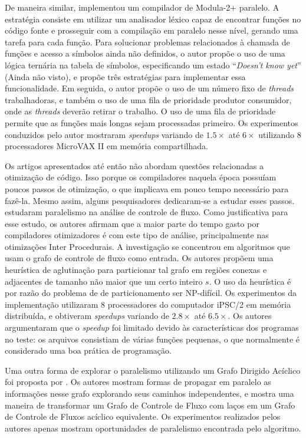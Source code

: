 De maneira similar, \cite{wortman1992} implementou um compilador de Modula-2+
paralelo. A estratégia consiste em utilizar um analisador léxico capaz de
encontrar funções no código fonte e prosseguir com a compilação em paralelo
nesse nível, gerando uma tarefa para cada função. Para solucionar problemas
relacionados à chamada de funções e
acesso a símbolos ainda não definidos, o autor propõe o uso de
uma lógica ternária na tabela de símbolos, especificando um estado
``\textit{Doesn't know yet}'' (Ainda não visto), e propõe três estratégias para
implementar essa funcionalidade. Em seguida, o autor propõe o uso de
um número fixo de \textit{threads} trabalhadoras, e também o uso de uma fila de
prioridade produtor consumidor, onde as \textit{threads} deverão retirar o trabalho.
O uso de uma fila de prioridade permite que as funções mais longas sejam
processadas primeiro. Os experimentos conduzidos pelo autor mostraram
\textit{speedups} variando de $1.5\times$ até $6\times$ utilizando 8
processadores MicroVAX II em memória compartilhada.

Os artigos apresentados até então não abordam questões relacionadas
a otimização de código. Isso porque os compiladores naquela época possuíam poucos
passos de otimização, o que implicava em pouco tempo necessário para fazê-la.
Mesmo assim, alguns pesquisadores dedicaram-se a estudar esses passos.
\cite{Lee1994} estudaram paralelismo na análise de controle
de fluxo. Como justificativa para esse estudo, os autores afirmam que a maior parte
do tempo gasto por compiladores otimizadores é com este tipo de análise,
principalmente nas otimizações Inter Procedurais. 
A investigação se concentrou em algoritmos que usam o grafo de controle
de fluxo como entrada. Os autores propõem uma heurística de aglutinação
para particionar tal grafo em regiões conexas e adjacentes de tamanho não maior
que um certo inteiro $s$. O uso da heurística é por razão do problema de
de particionamento ser NP-difícil.
Os experimentos da implementação utilizaram
8 processadores do computador iPSC/2 em memória distribuída, e 
obtiveram \textit{speedups} variando de
$2.8 \times$ até $6.5\times$. Os autores argumentaram que o \textit{speedup} foi
limitado devido às características dos programas no teste: os arquivos consistiam
de várias funções pequenas, o que normalmente é considerado uma boa prática de
programação.

Uma outra forma de explorar o paralelismo utilizando um Grafo Dirigido Acíclico
foi proposta por \cite{kramer1994combining}. Os autores mostram formas de propagar
em paralelo as informações nesse grafo explorando seus caminhos independentes,
e mostra uma maneira de transformar um Grafo de Controle de Fluxo com laços em
um Grafo de Controle de Fluxos acíclico equivalente. Os experimentos realizados
pelos autores apenas mostram oportunidades de paralelismo encontrada pelo
algoritmo.

